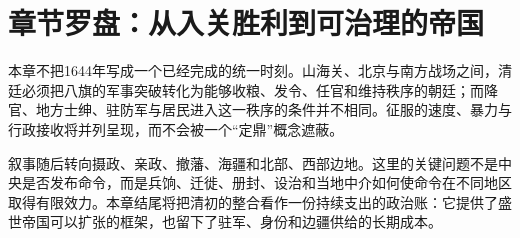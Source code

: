 \section{章节罗盘：从入关胜利到可治理的帝国}
\label{sec:early-qing-compass}

本章不把1644年写成一个已经完成的统一时刻。山海关、北京与南方战场之间，清廷必须把八旗的军事突破转化为能够收粮、发令、任官和维持秩序的朝廷；而降官、地方士绅、驻防军与居民进入这一秩序的条件并不相同。征服的速度、暴力与行政接收将并列呈现，而不会被一个“定鼎”概念遮蔽。

叙事随后转向摄政、亲政、撤藩、海疆和北部、西部边地。这里的关键问题不是中央是否发布命令，而是兵饷、迁徙、册封、设治和当地中介如何使命令在不同地区取得有限效力。本章结尾将把清初的整合看作一份持续支出的政治账：它提供了盛世帝国可以扩张的框架，也留下了驻军、身份和边疆供给的长期成本。
